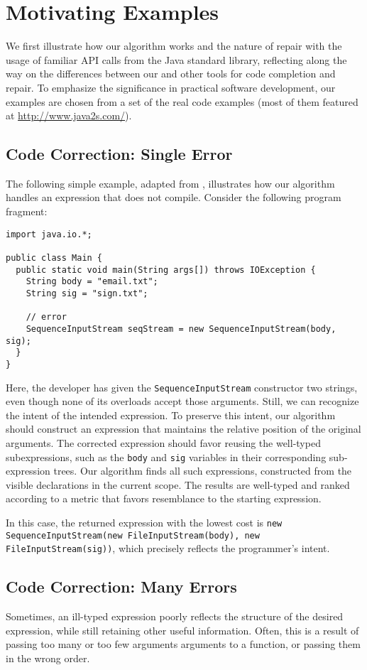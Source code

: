 \section{Motivating Examples}
\label{sec:examples}
We first illustrate how our algorithm works and the nature of repair with the usage of familiar API calls from the Java standard library, reflecting along the way on the differences between our and other tools for code completion and repair. To emphasize the significance in practical software development, our examples are chosen from a set of the real code examples (most of them featured at \url{http://www.java2s.com/}{}).

\subsection{Code Correction: Single Error}
The following simple example, adapted from \cite{GveroETAL13CompleteCompletionTypesWeights}, illustrates how our algorithm handles an expression that does not compile. Consider the following program fragment:
\begin{lstlisting}
import java.io.*;

public class Main {
  public static void main(String args[]) throws IOException {
    String body = "email.txt";
    String sig = "sign.txt";
    
    // error
    SequenceInputStream seqStream = new SequenceInputStream(body, sig);
  }
} 
\end{lstlisting}
Here, the developer has given the \lstinline{SequenceInputStream} constructor two strings, even though none of its overloads accept those arguments. Still, we can recognize the intent of the intended expression. To preserve this intent, our algorithm should construct an expression that maintains the relative position of the original arguments. The corrected expression should favor reusing the well-typed subexpressions, such as the \lstinline{body} and \lstinline{sig} variables in their corresponding sub-expression trees. Our algorithm finds all such expressions, constructed from the visible declarations in the current scope. The results are well-typed and ranked according to a metric that favors resemblance to the starting expression.

In this case, the returned expression with the lowest cost is \lstinline{new SequenceInputStream(new FileInputStream(body), new FileInputStream(sig))}, which precisely reflects the programmer's intent.

\subsection{Code Correction: Many Errors}
Sometimes, an ill-typed expression poorly reflects the structure of the desired expression, while still retaining other useful information. Often, this is a result of passing too many or too few arguments arguments to a function, or passing them in the wrong order.

